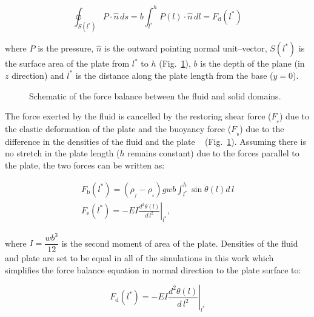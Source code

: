\documentclass[preprint, letterpaper, nobibnotes, aps, superscriptaddress,prb]{revtex4-1}
\begin{document}
\begin{equation}
\oint_{S(l^{*})}P\cdot\hat{n}\,ds = b\int_{l^{*}}^{h}P(l)\cdot\hat{n}\,dl = F_{\mathrm{{d}}}(l^{*})
\end{equation}\label{lin_momentum_eq}

where $P$ is the pressure, $\hat{n}$ is the outward pointing normal unit--vector, $S(l^{*})$ is the surface area of the plate from $l^{*}$ to $h$ (Fig.~\ref{fig:force_balance}), $b$ is the depth of the plane (in $z$ direction) and $l^{*}$ is the distance along the plate length from the base ($y=0$). 

\begin{figure}[h]
\centering {}
\caption{Schematic of the force balance between the fluid and solid domains.}\protect\label{fig:force_balance} 
\end{figure}

The force exerted by the fluid is cancelled by the restoring shear force ($F_{\mathrm{_{e}}}$) due to the elastic deformation of the plate and the buoyancy force ($F_{\mathrm{_{b}}}$) due to the difference in the densities of the fluid and the plate ~\cite{Luhar11} (Fig.~\ref{fig:force_balance}). Assuming there is no stretch in the plate length ($h$ remains constant) due to the forces parallel to the plate, the two forces can be written as:

\begin{gather}
F_{\mathrm{{b}}}(l^{*})=(\rho_{_f}-\rho_{_s})gwb\int_{l^{*}}^{h}\sin\theta(l)d\,l \\[2ex]
F_{\mathrm{{e}}}(l^{*})=-EI\left.\frac{d^2\theta(l)}{d\,l^2}\right\vert_{l^{*}},
\end{gather}

where $I=\dfrac{wb^3}{12}$ is the second moment of area of the plate. Densities of the fluid and plate are set to be equal in all of the simulations in this work which simplifies the force balance equation in normal direction to the plate surface to:

\begin{equation}
F_{\mathrm{{d}}}(l^{*})=-EI\left.\frac{d^2\theta(l)}{d\,l^2}\right\vert_{l^{*}}
\end{equation}\label{lin_momentum_eq}

\iffalse
\int_0^{L}f_{_d}(l)d\,l=\int_0^{L}\frac{1}{2}\rho C_{_D}bU^2(l) \cos^2\theta(l)\,dl
\begin{equation}
F_{\mathrm{_{d}}}=\int_{0}^{l}\frac{1}{2}\rho\,C_{_D}w(U\,\cos\theta)^2
\end{equation}
\fi
\end{document}
